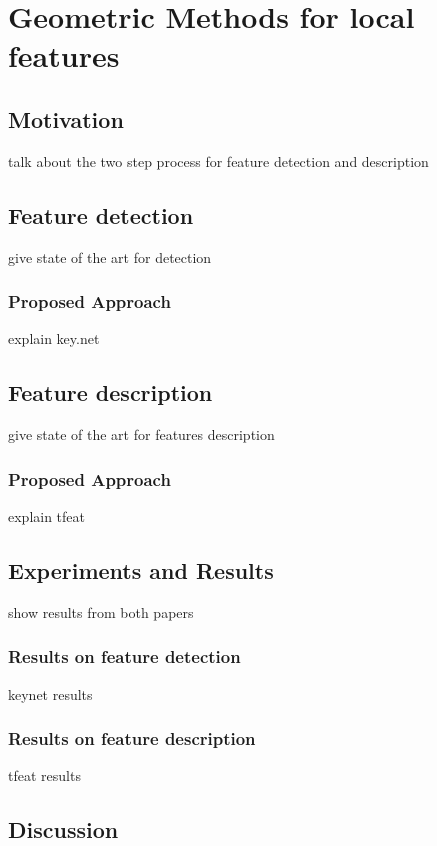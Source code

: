 \chapter{Geometric Methods for local features}
\label{chap:chap_02}
\vspace{-8mm}
\section{Motivation}

talk about the two step process for feature detection and description

\section{Feature detection}

give state of the art for detection

\subsection{Proposed Approach}
explain key.net~\citep{barroso2019keynet}

\section{Feature description}

give state of the art for features description

\subsection{Proposed Approach}
explain tfeat~\citep{balntas2016bmvc}

\section{Experiments and Results}
show results from both papers
\subsection{Results on feature detection}
keynet results
\subsection{Results on feature description}
tfeat results

\section{Discussion}